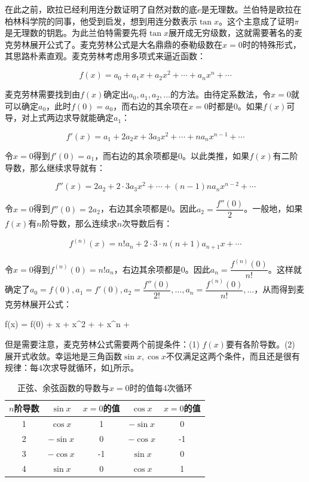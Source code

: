 \documentclass[b5paper]{ctexart}
\begin{document}
在此之前，欧拉已经利用连分数证明了自然对数的底$e$是无理数。兰伯特是欧拉在柏林科学院的同事，他受到启发，想到用连分数表示$\tan x$。这个主意成了证明$\pi$是无理数的钥匙。为此兰伯特需要先将$\tan x$展开成无穷级数，这就需要著名的麦克劳林展开公式了。麦克劳林公式是大名鼎鼎的泰勒级数在$x = 0$时的特殊形式，其思路朴素直观。麦克劳林考虑用多项式来逼近函数：

\[
f(x) = a_0 + a_1 x + a_2 x^2 + \dotsb + a_n x^n + \dotsb
\]

麦克劳林需要找到由$f(x)$确定出$a_0, a_1, a_2, \dots$的方法。由待定系数法，令$x = 0$就可以确定$a_0$，此时$f(0) = a_0$，而右边的其余项在$x = 0$时都是0。如果$f(x)$可导，对上式两边求导就能确定$a_1$：

\[
f'(x) = a_1 + 2a_2 x + 3 a_3 x^2 + \dotsb + n a_n x^{n-1} + \dotsb
\]

令$x = 0$得到$f'(0) = a_1$，而右边的其余项都是0。以此类推，如果$f(x)$有二阶导数，那么继续求导就有：

\[
f''(x) = 2a_2 + 2 \cdot 3 a_3 x^2 + \dotsb + (n-1)n a_n x^{n-2} + \dotsb
\]

令$x = 0$得到$f''(0) = 2a_2$，右边其余项都是0。因此$a_2 = \dfrac{f''(0)}{2}$。一般地，如果$f(x)$有$n$阶导数，那么连续求$n$次导数后有：

\[
f^{(n)}(x) = n!a_n + 2 \cdot 3 \cdot n (n+1) a_{n+1} x + \dotsb
\]

令$x = 0$得到$f^{(n)}(0) = n!a_n$，右边其余项都是0。因此$a_n = \dfrac{f^{(n)}(0)}{n!}$。这样就确定了$a_0 = f(0), a_1 = f'(0), a_2 = \dfrac{f''(0)}{2!}, \dotsc, a_n = \dfrac{f^{(n)}(0)}{n!}, \dotsc$，从而得到麦克劳林展开公式：

\be
f(x) = f(0) + x + x^2 + \dotsb + x^n + \dotsb
\ee

但是需要注意，麦克劳林公式需要两个前提条件：(1) $f(x)$要有各阶导数。(2) 展开式收敛。幸运地是三角函数$\sin x, \cos x$不仅满足这两个条件，而且还是很有规律：每4次求导就循环，如\cref{tab:sin-cos-derivatives}所示。

\begin{table}
  \centering
  \begin{tabular}{|c|c|c||c|c|}
    \hline
    $n$阶导数 & $\sin x$ & $x = 0$的值 & $\cos x$ & $x = 0$的值 \\
    \hline
    1 & $\cos x$  & 1  & $-\sin x$ & 0 \\
    \hline
    2 & $-\sin x$ & 0  & $-\cos x$ & -1 \\
    \hline
    3 & $-\cos x$ & -1 & $\sin x$  & 0 \\
    \hline
    4 & $\sin x$  & 0  & $\cos x$  & 1 \\
    \hline
  \end{tabular}
  \caption{正弦、余弦函数的导数与$x = 0$时的值每4次循环\label{tab:sin-cos-derivatives}}
\end{table}
\end{document}
